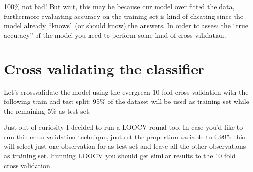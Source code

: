\documentclass[]{book}
\begin{document}
100\% not bad! But wait, this may be because our model over fitted the data, furthermore evaluating accuracy on the training set is kind of cheating since the model already ``knows'' (or should know) the answers. In order to assess the ``true accuracy'' of the model you need to perform some kind of cross validation.

\hypertarget{cross-validating-the-classifier}{%
\section{Cross validating the classifier}\label{cross-validating-the-classifier}}

Let's crossvalidate the model using the evergreen 10 fold cross validation with the following train and test split: 95\% of the dataset will be used as training set while the remaining 5\% as test set.

Just out of curiosity I decided to run a LOOCV round too. In case you'd like to run this cross validation technique, just set the proportion variable to 0.995: this will select just one observation for as test set and leave all the other observations as training set. Running LOOCV you should get similar results to the 10 fold cross validation.
\end{document}
